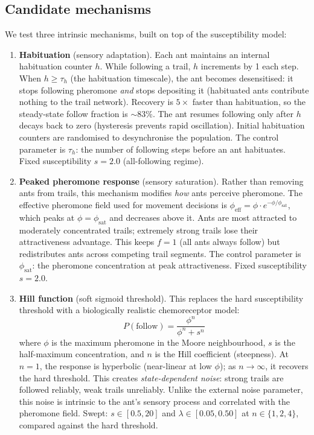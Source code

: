 \documentclass[11pt,a4paper]{article}
\begin{document}
\subsection{Candidate mechanisms}

We test three intrinsic mechanisms, built on top of the susceptibility model:

\begin{enumerate}
  \item \textbf{Habituation} (sensory adaptation).
    Each ant maintains an internal habituation counter $h$.
    While following a trail, $h$ increments by 1 each step.
    When $h \geq \tau_h$ (the habituation timescale), the ant becomes desensitised: it stops following pheromone \emph{and} stops depositing it (habituated ants contribute nothing to the trail network).
    Recovery is $5\times$ faster than habituation, so the steady-state follow fraction is $\sim$83\%.
    The ant resumes following only after $h$ decays back to zero (hysteresis prevents rapid oscillation).
    Initial habituation counters are randomised to desynchronise the population.
    The control parameter is $\tau_h$: the number of following steps before an ant habituates.
    Fixed susceptibility $s = 2.0$ (all-following regime).

  \item \textbf{Peaked pheromone response} (sensory saturation).
    Rather than removing ants from trails, this mechanism modifies \emph{how} ants perceive pheromone.
    The effective pheromone field used for movement decisions is $\phi_\text{eff} = \phi \cdot e^{-\phi / \phi_\text{sat}}$, which peaks at $\phi = \phi_\text{sat}$ and decreases above it.
    Ants are most attracted to moderately concentrated trails; extremely strong trails lose their attractiveness advantage.
    This keeps $f = 1$ (all ants always follow) but redistributes ants across competing trail segments.
    The control parameter is $\phi_\text{sat}$: the pheromone concentration at peak attractiveness.
    Fixed susceptibility $s = 2.0$.

  \item \textbf{Hill function} (soft sigmoid threshold).
    This replaces the hard susceptibility threshold with a biologically realistic chemoreceptor model:
    \begin{equation}
      P(\text{follow}) = \frac{\phi^n}{\phi^n + s^n}
      \label{eq:hill}
    \end{equation}
    where $\phi$ is the maximum pheromone in the Moore neighbourhood, $s$ is the half-maximum concentration, and $n$ is the Hill coefficient (steepness).
    At $n = 1$, the response is hyperbolic (near-linear at low $\phi$); as $n \to \infty$, it recovers the hard threshold.
    This creates \emph{state-dependent noise}: strong trails are followed reliably, weak trails unreliably.
    Unlike the external noise parameter, this noise is intrinsic to the ant's sensory process and correlated with the pheromone field.
    Swept: $s \in [0.5, 20]$ and $\lambda \in [0.05, 0.50]$ at $n \in \{1, 2, 4\}$, compared against the hard threshold.
\end{enumerate}
\end{document}

